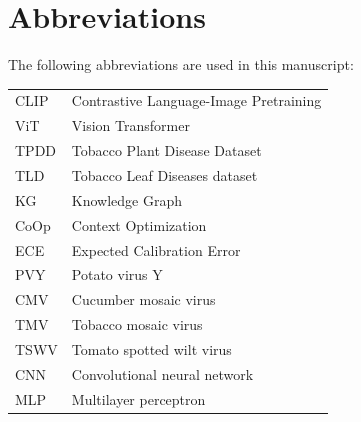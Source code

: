 \documentclass[10pt,a4paper]{article}
\begin{document}
\section*{Abbreviations}
The following abbreviations are used in this manuscript:
\par
\begin{tabular}{@{}l p{}@{}}
CLIP & Contrastive Language-Image Pretraining \\
ViT & Vision Transformer \\
TPDD & Tobacco Plant Disease Dataset \\
TLD & Tobacco Leaf Diseases dataset \\
KG & Knowledge Graph \\
CoOp & Context Optimization \\
ECE & Expected Calibration Error \\
PVY & Potato virus Y \\
CMV & Cucumber mosaic virus \\
TMV & Tobacco mosaic virus \\
TSWV & Tomato spotted wilt virus \\
CNN & Convolutional neural network \\
MLP & Multilayer perceptron \\
\end{tabular}

\vspace{6pt}
\end{document}
